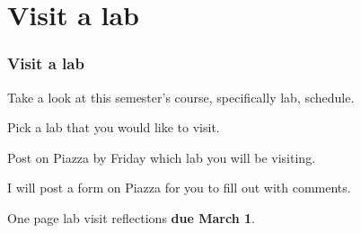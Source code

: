 \documentclass{beamer}
\begin{document}

\section{Visit a lab}


\begin{frame}
\frametitle{Visit a lab}

Take a look at this semester's course, specifically lab, schedule.

Pick a lab that you would like to visit.

Post on Piazza by Friday which lab you will be visiting.

I will post a form on Piazza for you to fill out with comments.

One page lab visit reflections \textbf{due March 1}.

\end{frame}

\end{document}
